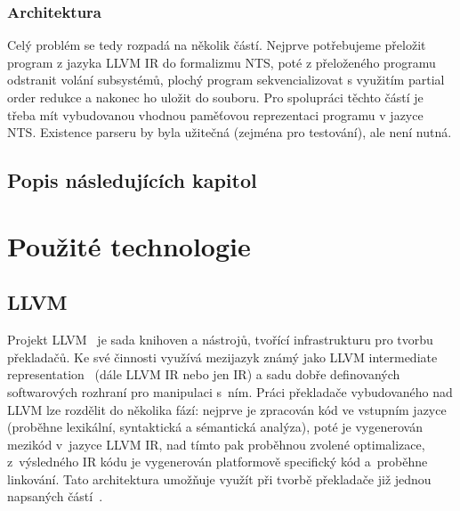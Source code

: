 \documentclass[10pt,a4paper,notitlepage]{report}
\begin{document}
\subsection{Architektura}
Celý problém se tedy rozpadá na několik částí. Nejprve potřebujeme přeložit program z jazyka LLVM IR do formalizmu NTS, poté z přeloženého programu odstranit volání subsystémů, plochý program sekvencializovat s využitím partial order redukce a nakonec ho uložit do souboru. Pro spolupráci těchto částí je třeba mít vybudovanou vhodnou paměťovou reprezentaci programu v jazyce NTS. Existence parseru by byla užitečná (zejména pro testování), ale není nutná.

\section{Popis následujících kapitol}



\chapter{Použité technologie}
\section{LLVM}
Projekt LLVM~\cite{LLVM} je sada knihoven a nástrojů, tvořící infrastrukturu pro tvorbu překladačů. Ke své činnosti využívá mezijazyk známý jako LLVM intermediate representation~\cite{LLVM-langRef} (dále LLVM IR nebo jen IR) a sadu dobře definovaných softwarových rozhraní pro manipulaci s~ním. Práci překladače vybudovaného nad LLVM lze rozdělit do několika fází: nejprve je zpracován kód ve vstupním jazyce (proběhne lexikální, syntaktická a sémantická analýza), poté je vygenerován mezikód v~jazyce LLVM IR, nad tímto pak proběhnou zvolené optimalizace, z~výsledného IR kódu je vygenerován platformově specifický kód a~proběhne linkování. Tato architektura umožňuje využít při tvorbě překladače již jednou napsaných částí~\cite{AOSABOOK-LLVM}.
\end{document}
